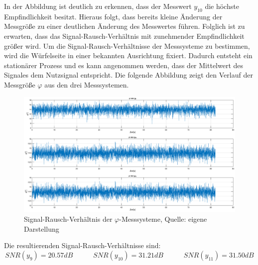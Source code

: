 In der Abbildung ist deutlich zu erkennen, dass der Messwert $y_{10}$ die höchste Empfindlichkeit besitzt. Hieraus folgt, dass bereits kleine Änderung der Messgröße zu einer deutlichen Änderung des Messwertes führen. Folglich ist zu erwarten, dass das Signal-Rausch-Verhältnis mit zunehmender Empfindlichkeit größer wird.
Um die Signal-Rausch-Verhältnisse der Messsysteme zu bestimmen, wird die Würfelseite in einer bekannten Ausrichtung fixiert. Dadurch entsteht ein stationärer Prozess und es kann angenommen werden, dass der Mittelwert des Signales dem Nutzsignal entspricht. Die folgende Abbildung zeigt den Verlauf der Messgröße $\varphi$ aus den drei Messsystemen.

\begin{figure}[h!]
\centering
\includegraphics[width=\linewidth]{3_Sensorik/img/snr_phi_plot}
\caption{Signal-Rausch-Verhältnis der $\varphi$-Messsysteme, Quelle: eigene Darstellung}
\end{figure}

Die resultierenden Signal-Rausch-Verhältnisse sind:
\begin{equation}
SNR(y_9) = 20.57dB \hspace{35pt}  SNR(y_{10}) = 31.21dB \hspace{35pt} SNR(y_{11})=31.50dB
\end{equation}

